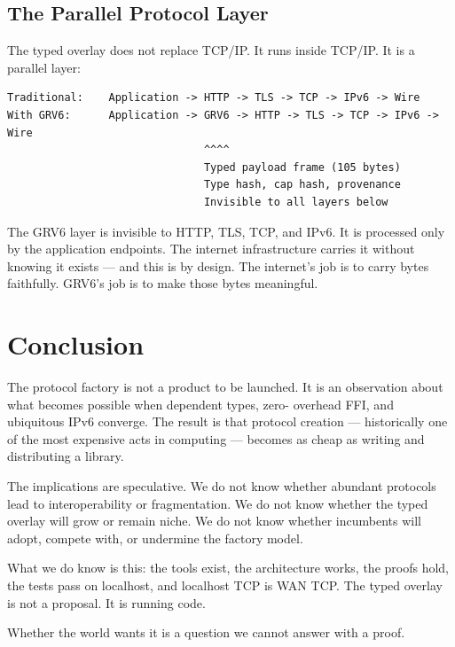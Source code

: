 \documentclass[11pt,a4paper]{article}
\begin{document}
\subsection{The Parallel Protocol Layer}

The typed overlay does not replace TCP/IP. It runs inside TCP/IP. It is
a parallel layer:

\begin{lstlisting}[caption={The parallel protocol layer}]
Traditional:    Application -> HTTP -> TLS -> TCP -> IPv6 -> Wire
With GRV6:      Application -> GRV6 -> HTTP -> TLS -> TCP -> IPv6 -> Wire
                               ^^^^
                               Typed payload frame (105 bytes)
                               Type hash, cap hash, provenance
                               Invisible to all layers below
\end{lstlisting}

The GRV6 layer is invisible to HTTP, TLS, TCP, and IPv6. It is
processed only by the application endpoints. The internet infrastructure
carries it without knowing it exists --- and this is by design. The
internet's job is to carry bytes faithfully. GRV6's job is to make those
bytes meaningful.

\section{Conclusion}

The protocol factory is not a product to be launched. It is an
observation about what becomes possible when dependent types, zero-
overhead FFI, and ubiquitous IPv6 converge. The result is that protocol
creation --- historically one of the most expensive acts in computing
--- becomes as cheap as writing and distributing a library.

The implications are speculative. We do not know whether abundant
protocols lead to interoperability or fragmentation. We do not know
whether the typed overlay will grow or remain niche. We do not know
whether incumbents will adopt, compete with, or undermine the factory
model.

What we do know is this: the tools exist, the architecture works, the
proofs hold, the tests pass on localhost, and localhost TCP is WAN TCP.
The typed overlay is not a proposal. It is running code.

Whether the world wants it is a question we cannot answer with a proof.
\end{document}
